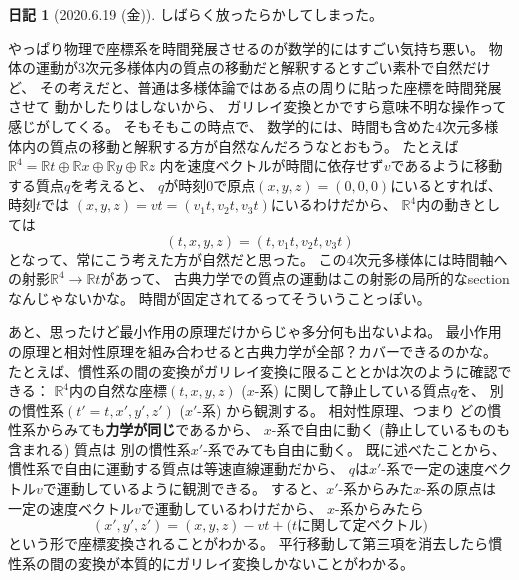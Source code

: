 \documentclass[uplatex]{jsarticle}
\theoremstyle{definition}
\newtheorem*{nikki*}{日記}
\def\R{\mathbb{R}}
\begin{document}
\begin{nikki*}[2020.6.19 (金)]
  しばらく放ったらかしてしまった。

  やっぱり物理で座標系を時間発展させるのが数学的にはすごい気持ち悪い。
  物体の運動が3次元多様体内の質点の移動だと解釈するとすごい素朴で自然だけど、
  その考えだと、普通は多様体論ではある点の周りに貼った座標を時間発展させて
  動かしたりはしないから、
  ガリレイ変換とかですら意味不明な操作って感じがしてくる。
  そもそもこの時点で、
  数学的には、時間も含めた4次元多様体内の質点の移動と解釈する方が自然なんだろうなとおもう。
  たとえば\(\R^4=\R t \oplus \R x \oplus \R y \oplus \R z\)
  内を速度ベクトルが時間に依存せず\(v\)であるように移動する質点\(q\)を考えると、
  \(q\)が時刻\(0\)で原点\((x,y,z)=(0,0,0)\)にいるとすれば、
  時刻\(t\)では
  \((x,y,z) = vt = (v_1t,v_2t,v_3t)\)にいるわけだから、
  \(\R^4\)内の動きとしては
  \[
  (t,x,y,z) = (t,v_1t,v_2t,v_3t)
  \]
  となって、常にこう考えた方が自然だと思った。
  この4次元多様体には時間軸への射影\(\R^4 \to \R t\)があって、
  古典力学での質点の運動はこの射影の局所的なsectionなんじゃないかな。
  時間が固定されてるってそういうことっぽい。

  あと、思ったけど最小作用の原理だけからじゃ多分何も出ないよね。
  最小作用の原理と相対性原理を組み合わせると古典力学が全部？カバーできるのかな。
  たとえば、慣性系の間の変換がガリレイ変換に限ることとかは次のように確認できる：
  \(\R^4\)内の自然な座標\((t,x,y,z)\) (\(x\)-系)
  に関して静止している質点\(q\)を、
  別の慣性系\((t'=t,x',y',z')\) (\(x'\)-系) から観測する。
  相対性原理、つまり
  どの慣性系からみても\textbf{力学が同じ}であるから、
  \(x\)-系で自由に動く (静止しているものも含まれる) 質点は
  別の慣性系\(x'\)-系でみても自由に動く。
  既に述べたことから、慣性系で自由に運動する質点は等速直線運動だから、
  \(q\)は\(x'\)-系で一定の速度ベクトル\(v\)で運動しているように観測できる。
  すると、\(x'\)-系からみた\(x\)-系の原点は
  一定の速度ベクトル\(v\)で運動しているわけだから、
  \(x\)-系からみたら
  \[
  (x',y',z') = (x,y,z) - vt + \text{(\(t\)に関して定ベクトル)}
  \]
  という形で座標変換されることがわかる。
  平行移動して第三項を消去したら慣性系の間の変換が本質的にガリレイ変換しかないことがわかる。
\end{nikki*}
\end{document}
